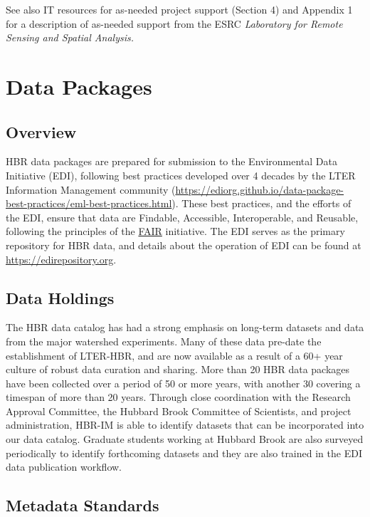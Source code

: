 \documentclass[
  letterpaper,
  DIV=11,
  numbers=noendperiod]{scrreprt}
\begin{document}
See also IT resources for as-needed project support (Section 4) and
Appendix 1 for a description of as-needed support from the ESRC
\emph{Laboratory for Remote Sensing and Spatial Analysis.}

\section{Data Packages}\label{data-packages}

\subsection{Overview}\label{overview}

HBR data packages are prepared for submission to the Environmental Data
Initiative (EDI), following best practices developed over 4 decades by
the LTER Information Management community
(\url{https://ediorg.github.io/data-package-best-practices/eml-best-practices.html}).
These best practices, and the efforts of the EDI, ensure that data are
Findable, Accessible, Interoperable, and Reusable, following the
principles of the
\href{https://www.go-fair.org/go-fair-initiative}{FAIR} initiative. The
EDI serves as the primary repository for HBR data, and details about the
operation of EDI can be found at
\href{https://edirepository.org/}{https://edirepository.org}.

\subsection{Data Holdings}\label{data-holdings}

The HBR data catalog has had a strong emphasis on long-term datasets and
data from the major watershed experiments. Many of these data pre-date
the establishment of LTER-HBR, and are now available as a result of a
60+ year culture of robust data curation and sharing. More than 20 HBR
data packages have been collected over a period of 50 or more years,
with another 30 covering a timespan of more than 20 years. Through close
coordination with the Research Approval Committee, the Hubbard Brook
Committee of Scientists, and project administration, HBR-IM is able to
identify datasets that can be incorporated into our data catalog.
Graduate students working at Hubbard Brook are also surveyed
periodically to identify forthcoming datasets and they are also trained
in the EDI data publication workflow.

\subsection{Metadata Standards}\label{metadata-standards}
\end{document}
